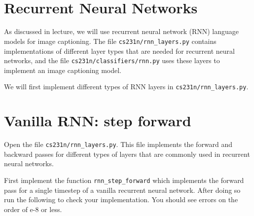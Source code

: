 \documentclass[11pt]{article}
\begin{document}
    \begin{center}
    \end{center}
    { \hspace*{\fill} \\}
    
    \begin{center}
    \end{center}
    { \hspace*{\fill} \\}
    
    \hypertarget{recurrent-neural-networks}{%
\section{Recurrent Neural Networks}\label{recurrent-neural-networks}}

As discussed in lecture, we will use recurrent neural network (RNN)
language models for image captioning. The file
\texttt{cs231n/rnn\_layers.py} contains implementations of different
layer types that are needed for recurrent neural networks, and the file
\texttt{cs231n/classifiers/rnn.py} uses these layers to implement an
image captioning model.

We will first implement different types of RNN layers in
\texttt{cs231n/rnn\_layers.py}.

    \hypertarget{vanilla-rnn-step-forward}{%
\section{Vanilla RNN: step forward}\label{vanilla-rnn-step-forward}}

Open the file \texttt{cs231n/rnn\_layers.py}. This file implements the
forward and backward passes for different types of layers that are
commonly used in recurrent neural networks.

First implement the function \texttt{rnn\_step\_forward} which
implements the forward pass for a single timestep of a vanilla recurrent
neural network. After doing so run the following to check your
implementation. You should see errors on the order of e-8 or less.
\end{document}
